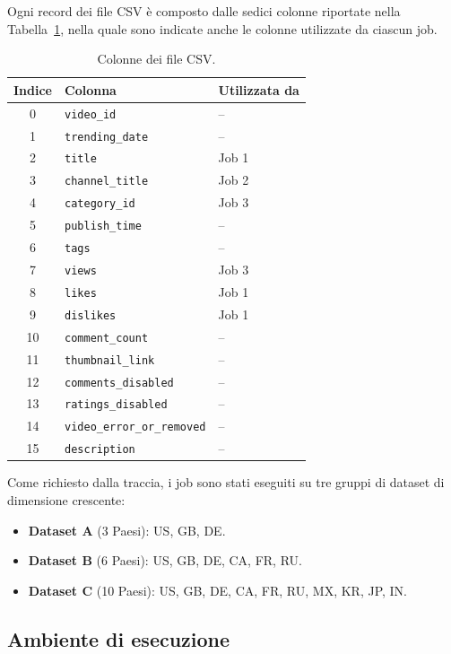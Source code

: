 \documentclass[12pt, a4paper]{article}
\begin{document}
Ogni record dei file CSV è composto dalle sedici colonne
riportate nella Tabella~\ref{tab:colonne}, nella quale
sono indicate anche le colonne utilizzate da ciascun job.

\begin{table}[H]
\centering
\small
\begin{tabular}{|c|l|l|}
\hline
\textbf{Indice} & \textbf{Colonna} & \textbf{Utilizzata da} \\
\hline
0 & \texttt{video\_id} & -- \\
1 & \texttt{trending\_date} & -- \\
2 & \texttt{title} & Job 1 \\
3 & \texttt{channel\_title} & Job 2 \\
4 & \texttt{category\_id} & Job 3 \\
5 & \texttt{publish\_time} & -- \\
6 & \texttt{tags} & -- \\
7 & \texttt{views} & Job 3 \\
8 & \texttt{likes} & Job 1 \\
9 & \texttt{dislikes} & Job 1 \\
10 & \texttt{comment\_count} & -- \\
11 & \texttt{thumbnail\_link} & -- \\
12 & \texttt{comments\_disabled} & -- \\
13 & \texttt{ratings\_disabled} & -- \\
14 & \texttt{video\_error\_or\_removed} & -- \\
15 & \texttt{description} & -- \\
\hline
\end{tabular}
\caption{Colonne dei file CSV.}
\label{tab:colonne}
\end{table}

Come richiesto dalla traccia, i job sono stati eseguiti
su tre gruppi di dataset di dimensione crescente:

\begin{itemize}
    \item \textbf{Dataset A} (3 Paesi): US, GB, DE.

    \item \textbf{Dataset B} (6 Paesi): US, GB, DE, CA, FR, RU.

    \item \textbf{Dataset C} (10 Paesi): US, GB, DE, CA, FR, RU,
    MX, KR, JP, IN.
\end{itemize}

\subsection{Ambiente di esecuzione}
\end{document}
